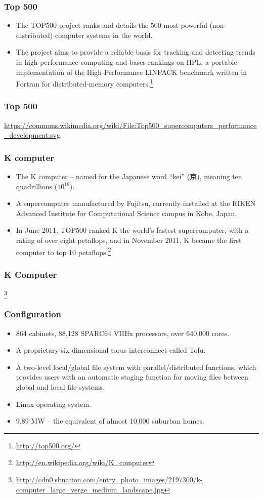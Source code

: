 \documentclass{beamer}
\begin{document}
\begin{CJK}{UTF8}{bsmi}
\begin{frame}
\frametitle{Top 500}
\begin{itemize}
\item The TOP500 project ranks and details the 500 most powerful
  (non-distributed) computer systems in the world.
\item The project aims to provide a reliable basis for tracking and
  detecting trends in high-performance computing and bases rankings on
  HPL, a portable implementation of the High-Performance LINPACK
  benchmark written in Fortran for distributed-memory computers.\footnote{\url{http://top500.org/}}
\end{itemize}
\end{frame}

\begin{frame}
\frametitle{Top 500}
\centerline{}
\url{https://commons.wikimedia.org/wiki/File:Top500_supercomputers_performance_development.svg}
\end{frame}

\begin{frame}
\frametitle{K computer}
\begin{itemize}
\item The K computer -- named for the Japanese word ``kei'' (京),
  meaning ten quadrillions ($10^{16}$).
\item A supercomputer manufactured by Fujitsu, currently installed at
  the RIKEN Advanced Institute for Computational Science campus in
  Kobe, Japan.
\item In June 2011, TOP500 ranked K the world's fastest supercomputer,
  with a rating of over eight petaflops, and in November 2011, K became
  the first computer to top 10 petaflops.\footnote{\url{http://en.wikipedia.org/wiki/K_computer}}
\end{itemize}
\end{frame}

\begin{frame}
\frametitle{K Computer}
\centerline{}
\footnote{\url{http://cdn0.sbnation.com/entry_photo_images/2197300/k-computer_large_verge_medium_landscape.jpg}}
\end{frame}

\begin{frame}
\frametitle{Configuration}
\begin{itemize}
\item 864 cabinets, 88,128 SPARC64 VIIIfx processors, over 640,000 cores.
\item A proprietary six-dimensional torus interconnect called Tofu.
\item A two-level local/global file system with parallel/distributed
  functions, which provides users with an automatic staging function for
  moving files between global and local file systems.
\item Linux operating system.
\item 9.89 MW -- the equivalent of almost 10,000 suburban homes.
\end{itemize}
\end{frame}


\end{CJK}
\end{document}
